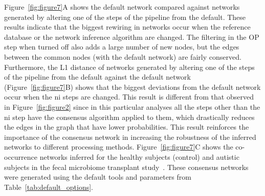   Figure~\ref{fig:figure7}A shows the default network compared against networks generated by altering one of the steps of the pipeline from the default.
  These results indicate that the biggest rewiring in networks occur when the reference database or the network inference algorithm are changed.
  The filtering in the \ac{OP} step when turned off also adds a large number of new nodes, but the edges between the common nodes (with the default network) are fairly conserved.
  Furthermore, the L1 distance of networks generated by altering one of the steps of the pipeline from the default against the default network (Figure~\ref{fig:figure7}B) shows that the biggest deviations from the default network occur when the \ac{ni} steps are changed.
  This result is different from that observed in Figure~\ref{fig:figure2} since in this particular analyses all the steps other than the \ac{ni} step have the consensus algorithm applied to them, which drastically reduces the edges in the graph that have lower probabilities.
  This result reinforces the importance of the consensus network in increasing the robustness of the inferred networks to different processing methods.
  Figure~\ref{fig:figure7}C shows the co-occurrence networks inferred for the healthy subjects (control) and autistic subjects in the fecal microbiome transplant study~\cite{Kang2017}.
  These consensus networks were generated using the default tools and parameters from Table~\ref{tab:default_options}.
